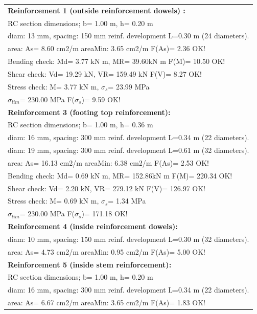 \begin{center}
\begin{supertabular}[H]{|l|}
\hline
\textbf{Reinforcement 1 (outside reinforcement dowels) :} \\
  RC section dimensions; b= 1.00 m, h= 0.20 m\\
  diam: 13 mm, spacing: 150 mm  reinf. development L=0.30 m (24 diameters).\\
  area: As=   8.60 cm2/m areaMin:   3.65 cm2/m  F(As)= 2.36 OK!\\
  Bending check: Md=   3.77 kN m, MR=  39.60kN m  F(M)= 10.50 OK!\\
  Shear check: Vd=  19.29 kN,  VR= 159.49 kN  F(V)= 8.27 OK!\\
  Stress check: M=   3.77 kN m, $\sigma_s$=  23.99 MPa\\
    $\sigma_{lim}$= 230.00 MPa  F($\sigma_s$)= 9.59 OK!\\
\textbf{Reinforcement 3 (footing top reinforcement):}\\
  RC section dimensions; b= 1.00 m, h= 0.36 m\\
  diam: 16 mm, spacing: 300 mm  reinf. development L=0.34 m (22 diameters).\\
  diam: 19 mm, spacing: 300 mm  reinf. development L=0.61 m (32 diameters).\\
  area: As=  16.13 cm2/m areaMin:   6.38 cm2/m  F(As)= 2.53 OK!\\
  Bending check: Md=   0.69 kN m, MR= 152.86kN m  F(M)= 220.34 OK!\\
  Shear check: Vd=   2.20 kN,  VR= 279.12 kN  F(V)= 126.97 OK!\\
  Stress check: M=   0.69 kN m, $\sigma_s$=   1.34 MPa\\
    $\sigma_{lim}$= 230.00 MPa  F($\sigma_s$)= 171.18 OK!\\
\textbf{Reinforcement 4 (inside reinforcement dowels):}\\
  diam: 10 mm, spacing: 150 mm  reinf. development L=0.30 m (32 diameters).\\
  area: As=   4.73 cm2/m areaMin:   0.95 cm2/m  F(As)= 5.00 OK!\\
\textbf{Reinforcement 5 (inside stem reinforcement):}\\
  RC section dimensions; b= 1.00 m, h= 0.20 m\\
  diam: 16 mm, spacing: 300 mm  reinf. development L=0.34 m (22 diameters).\\
  area: As=   6.67 cm2/m areaMin:   3.65 cm2/m  F(As)= 1.83 OK!\\

\end{supertabular}
\end{center}
